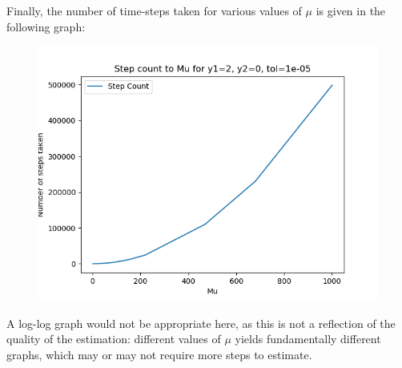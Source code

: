 \documentclass{article}
\begin{document}
\begin{itemize}
		Finally, the number of time-steps taken for various values of
		$\mu$ is given in the following graph:
		\begin{figure}[H]
			\includegraphics[scale=0.6]{Mu_to_steps}
		\end{figure}

		A log-log graph would not be appropriate here, as this is not a
		reflection of the quality of the estimation:  different values
		of $\mu$ yields fundamentally different graphs, which may or may
		not require more steps to estimate. 
\end{itemize}
\end{document}
